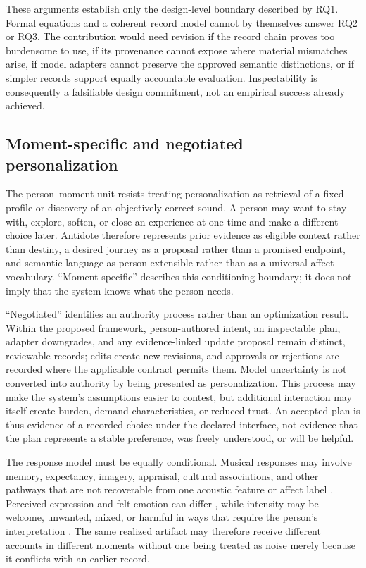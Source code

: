 These arguments establish only the design-level boundary described by RQ1.
Formal equations and a coherent record model cannot by themselves answer RQ2
or RQ3. The contribution would need revision if the record chain proves too
burdensome to use, if its provenance cannot expose where material mismatches
arise, if model adapters cannot preserve the approved semantic distinctions, or
if simpler records support equally accountable evaluation. Inspectability is
consequently a falsifiable design commitment, not an empirical success already
achieved.

\subsection{Moment-specific and negotiated personalization}
\label{sec:discussion-negotiated-personalization}

The person--moment unit resists treating personalization as retrieval of a
fixed profile or discovery of an objectively correct sound. A person may want
to stay with, explore, soften, or close an experience at one time and make a
different choice later. Antidote therefore represents prior evidence as
eligible context rather than destiny, a desired journey as a proposal rather
than a promised endpoint, and semantic language as person-extensible rather
than as a universal affect vocabulary. ``Moment-specific'' describes this
conditioning boundary; it does not imply that the system knows what the person
needs.

``Negotiated'' identifies an authority process rather than an optimization
result. Within the proposed framework, person-authored intent, an inspectable
plan, adapter downgrades, and any evidence-linked update proposal remain
distinct, reviewable records; edits create new revisions, and approvals or
rejections are recorded where the applicable contract permits them. Model
uncertainty is not converted into authority by being presented as
personalization. This process may make the system's assumptions easier to
contest, but additional interaction may itself create burden, demand
characteristics, or reduced trust. An accepted plan is thus evidence of a
recorded choice under the declared interface, not evidence that the plan
represents a stable preference, was freely understood, or will be helpful.

The response model must be equally conditional. Musical responses may involve
memory, expectancy, imagery, appraisal, cultural associations, and other
pathways that are not recoverable from one acoustic feature or affect label
\citep{juslin2008emotional}. Perceived expression and felt emotion can differ
\citep{zentner2008emotions}, while intensity may be welcome, unwanted, mixed,
or harmful in ways that require the person's interpretation
\citep{silverman2020complicated}. The same realized artifact may therefore
receive different accounts in different moments without one being treated as
noise merely because it conflicts with an earlier record.

